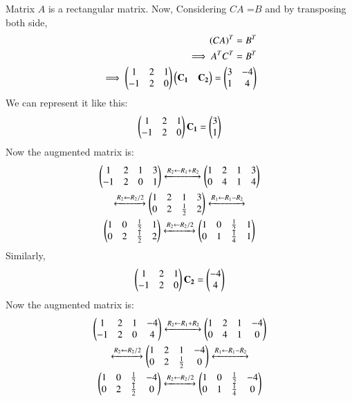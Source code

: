 \documentclass[journal,12pt,twocolumn]{IEEEtran}
\begin{document}
Matrix $A$ is a rectangular matrix.
Now, Considering $CA$ =$B$ and by transposing both side,
\begin{align}
(CA)^T = B^T\\
\implies A^T C^T = B^T\\
\implies \begin{pmatrix}1 & 2 & 1\\-1 & 2 & 0\end{pmatrix} \begin{pmatrix}\mathbf{C_1} & \mathbf{C_2}\end{pmatrix} = \begin{pmatrix}3 & -4\\1 & 4\end{pmatrix}
\end{align}
We can represent it like this:
\begin{align}
\begin{pmatrix}1 & 2 & 1\\-1 & 2 & 0\end{pmatrix} \mathbf{C_1} = \begin{pmatrix}3\\1\end{pmatrix}\\
\end{align}
Now the augmented matrix is:
\begin{multline}
\begin{pmatrix}1 & 2 & 1 & 3\\-1 & 2 & 0 & 1\end{pmatrix}\xleftrightarrow[]{R_2\leftarrow R_1+R_2}\begin{pmatrix}1 & 2 & 1 & 3\\0 & 4 & 1 & 4\end{pmatrix}\\ 
\xleftrightarrow[]{R_2\leftarrow R_2/2}\begin{pmatrix}1 & 2 & 1 & 3\\0 & 2 & \frac{1}{2} & 2\end{pmatrix}\xleftrightarrow[]{R_1\leftarrow R_1-R_2}\\
\begin{pmatrix}1 & 0 & \frac{1}{2} & 1\\0 & 2 & \frac{1}{2} & 2\end{pmatrix}\xleftrightarrow[]{R_2\leftarrow R_2/2}\begin{pmatrix}1 & 0 & \frac{1}{2} & 1\\0 & 1 & \frac{1}{4} & 1\end{pmatrix}
\label{eqn:1}
\end{multline}
Similarly,
\begin{align}
\begin{pmatrix}1 & 2 & 1\\-1 & 2 & 0\end{pmatrix} \mathbf{C_2} = \begin{pmatrix}-4\\4\end{pmatrix}\\
\end{align}
Now the augmented matrix is:
\begin{multline}
\begin{pmatrix}1 & 2 & 1 & -4\\-1 & 2 & 0 & 4\end{pmatrix}\xleftrightarrow[]{R_2\leftarrow R_1+R_2}\begin{pmatrix}1 & 2 & 1 & -4\\0 & 4 & 1 & 0\end{pmatrix}\\ 
\xleftrightarrow[]{R_2\leftarrow R_2/2}\begin{pmatrix}1 & 2 & 1 & -4\\0 & 2 & \frac{1}{2} & 0\end{pmatrix}\xleftrightarrow[]{R_1\leftarrow R_1-R_2}\\
\begin{pmatrix}1 & 0 & \frac{1}{2} & -4\\0 & 2 & \frac{1}{2} & 0\end{pmatrix}\xleftrightarrow[]{R_2\leftarrow R_2/2}\begin{pmatrix}1 & 0 & \frac{1}{2} & -4\\0 & 1 & \frac{1}{4} & 0\end{pmatrix}
\label{eqn:2}
\end{multline}
\end{document}
